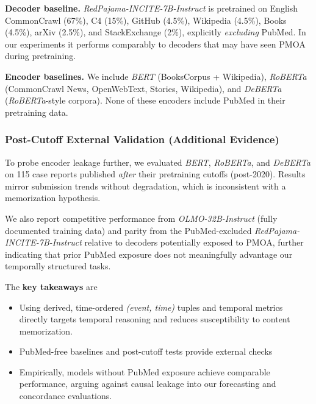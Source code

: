 \textbf{Decoder baseline.} 
\emph{RedPajama-INCITE-7B-Instruct} is pretrained on English CommonCrawl (67\%), C4 (15\%), GitHub (4.5\%), Wikipedia (4.5\%), Books (4.5\%), arXiv (2.5\%), and StackExchange (2\%), explicitly \emph{excluding} PubMed. In our experiments it performs comparably to decoders that may have seen PMOA during pretraining.

\textbf{Encoder baselines.} 
We include \emph{BERT} (BooksCorpus + Wikipedia), \emph{RoBERTa} (CommonCrawl News, OpenWebText, Stories, Wikipedia), and \emph{DeBERTa} (\textit{RoBERTa}-style corpora).
None of these encoders include PubMed in their pretraining data.


\subsubsection{Post-Cutoff External Validation (Additional Evidence)}
To probe encoder leakage further, we evaluated \textit{BERT}, \textit{RoBERTa}, and \textit{DeBERTa} on 115 case reports published \emph{after} their pretraining cutoffs (post-2020).
Results mirror submission trends without degradation, which is inconsistent with a memorization hypothesis.





We also report competitive performance from \emph{OLMO-32B-Instruct} (fully documented training data) and parity from the PubMed-excluded \emph{RedPajama-INCITE-7B-Instruct} relative to decoders potentially exposed to PMOA, further indicating that prior PubMed exposure does not meaningfully advantage our temporally structured tasks.

The \textbf{key takeaways} are 
\begin{itemize}
    \item Using derived, time-ordered \emph{(event, time)} tuples and temporal metrics directly targets temporal reasoning and reduces susceptibility to content memorization.
    \item PubMed-free baselines and post-cutoff tests provide external checks
    \item Empirically, models without PubMed exposure achieve comparable performance, arguing against causal leakage into our forecasting and concordance evaluations.
\end{itemize}


